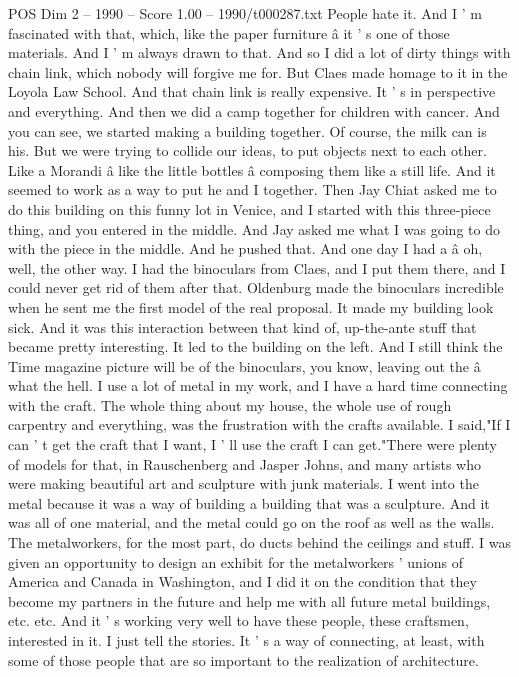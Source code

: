 \begin{textsample}{POS Dim 2 – 1990 – Score 1.00 – 1990/t000287.txt}
People hate it.
And I ' m fascinated with that, which, like the paper furniture â it ' s one of those materials.
And I ' m always drawn to that.
And so I did a lot of dirty things with chain link, which nobody will forgive me for.
But Claes made homage to it in the Loyola Law School.
And that chain link is really expensive.
It ' s in perspective and everything.
And then we did a camp together for children with cancer.
And you can see, we started making a building together.
Of course, the milk can is his.
But we were trying to collide our ideas, to put objects next to each other.
Like a Morandi â like the little bottles â composing them like a still life.
And it seemed to work as a way to put he and I together.
Then Jay Chiat asked me to do this building on this funny lot in Venice, and I started with this three-piece thing, and you entered in the middle.
And Jay asked me what I was going to do with the piece in the middle.
And he pushed that.
And one day I had a â oh, well, the other way.
I had the binoculars from Claes, and I put them there, and I could never get rid of them after that.
Oldenburg made the binoculars incredible when he sent me the first model of the real proposal.
It made my building look sick.
And it was this interaction between that kind of, up-the-ante stuff that became pretty interesting.
It led to the building on the left.
And I still think the Time magazine picture will be of the binoculars, you know, leaving out the â what the hell.
I use a lot of metal in my work, and I have a hard time connecting with the craft.
The whole thing about my house, the whole use of rough carpentry and everything, was the frustration with the crafts available.
I said,"If I can ' t get the craft that I want, I ' ll use the craft I can get."There were plenty of models for that, in Rauschenberg and Jasper Johns, and many artists who were making beautiful art and sculpture with junk materials.
I went into the metal because it was a way of building a building that was a sculpture.
And it was all of one material, and the metal could go on the roof as well as the walls.
The metalworkers, for the most part, do ducts behind the ceilings and stuff.
I was given an opportunity to design an exhibit for the metalworkers ' unions of America and Canada in Washington, and I did it on the condition that they become my partners in the future and help me with all future metal buildings, etc. etc.
And it ' s working very well to have these people, these craftsmen, interested in it.
I just tell the stories.
It ' s a way of connecting, at least, with some of those people that are so important to the realization of architecture.

\end{textsample}
